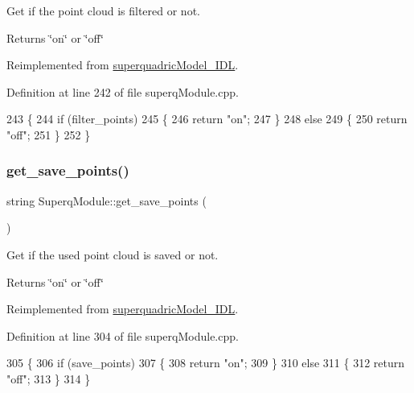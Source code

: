 Get if the point cloud is filtered or not. 

\begin{DoxyReturn}{Returns}
\char`\"{}on\char`\"{} or \char`\"{}off\char`\"{} 
\end{DoxyReturn}


Reimplemented from \mbox{\hyperlink{classsuperquadricModel__IDL_aa490ebcf39414aaaae41d5095267abb9}{superquadric\+Model\+\_\+\+I\+DL}}.



Definition at line 242 of file superq\+Module.\+cpp.


\begin{DoxyCode}
243 \{
244     \textcolor{keywordflow}{if} (filter_points)
245     \{
246         \textcolor{keywordflow}{return} \textcolor{stringliteral}{"on"};
247     \}
248     \textcolor{keywordflow}{else}
249     \{
250         \textcolor{keywordflow}{return} \textcolor{stringliteral}{"off"};
251     \}
252 \}
\end{DoxyCode}
\mbox{\label{classSuperqModule_adfeeea091edd0d32d388b072f4fc9d93}} 
\subsubsection{\texorpdfstring{get\+\_\+save\+\_\+points()}{get\_save\_points()}}
{\footnotesize\ttfamily string Superq\+Module\+::get\+\_\+save\+\_\+points (\begin{DoxyParamCaption}{ }\end{DoxyParamCaption})\hspace{0.3cm}{\ttfamily [virtual]}}



Get if the used point cloud is saved or not. 

\begin{DoxyReturn}{Returns}
\char`\"{}on\char`\"{} or \char`\"{}off\char`\"{} 
\end{DoxyReturn}


Reimplemented from \mbox{\hyperlink{classsuperquadricModel__IDL_a4b101fe118a1ee912468562bde0b0df4}{superquadric\+Model\+\_\+\+I\+DL}}.



Definition at line 304 of file superq\+Module.\+cpp.


\begin{DoxyCode}
305 \{
306     \textcolor{keywordflow}{if} (save_points)
307     \{
308         \textcolor{keywordflow}{return} \textcolor{stringliteral}{"on"};
309     \}
310     \textcolor{keywordflow}{else}
311     \{
312         \textcolor{keywordflow}{return} \textcolor{stringliteral}{"off"};
313     \}
314 \}
\end{DoxyCode}
\mbox{\label{classsuperquadricModel__IDL_a10039bb93445066d9dd29d8f6c9ef6c5}} 
